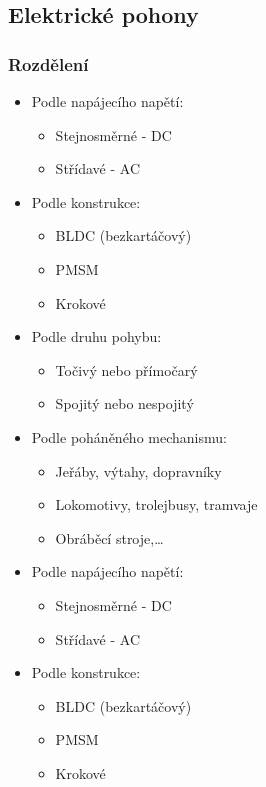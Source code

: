 \subsection{Elektrické pohony}
\subsubsection*{Rozdělení}
\begin{itemize}
  \item Podle napájecího napětí: \begin{itemize}
    \item Stejnosměrné - DC
    \item Střídavé - AC 
  \end{itemize}
  \item Podle konstrukce: \begin{itemize}
    \item BLDC (bezkartáčový)
    \item PMSM 
    \item Krokové
  \end{itemize}
  \item Podle druhu pohybu: \begin{itemize}
    \item Točivý nebo přímočarý
    \item Spojitý nebo nespojitý
  \end{itemize}
  \item Podle poháněného mechanismu: \begin{itemize}
    \item Jeřáby, výtahy, dopravníky
    \item Lokomotivy, trolejbusy, tramvaje
    \item Obráběcí stroje,\dots
  \end{itemize}
    \item Podle napájecího napětí: \begin{itemize}
              \item Stejnosměrné - DC
              \item Střídavé - AC
          \end{itemize}
    \item Podle konstrukce: \begin{itemize}
              \item BLDC (bezkartáčový)
              \item PMSM
              \item Krokové
          \end{itemize}

\end{itemize}
